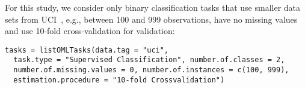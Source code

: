 For this study, we consider only binary classification tasks that use smaller 
data sets from UCI~\citep{Asuncion:2007p519}, e.g., between 100 and 999 observations, 
have no missing values and use 10-fold cross-validation for validation:

\begin{knitrout}\small
{}\color{fgcolor}\begin{kframe}
\begin{verbatim}
tasks = listOMLTasks(data.tag = "uci",
  task.type = "Supervised Classification", number.of.classes = 2,
  number.of.missing.values = 0, number.of.instances = c(100, 999),
  estimation.procedure = "10-fold Crossvalidation")
\end{verbatim}
\end{kframe}
\end{knitrout}

